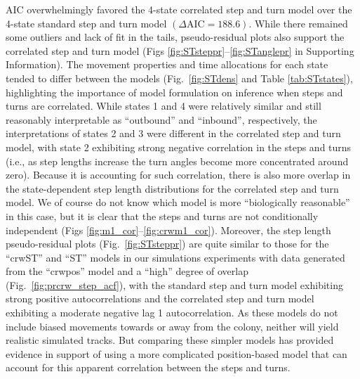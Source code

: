 \documentclass[12pt]{article}\usepackage[]{graphicx}\usepackage[]{xcolor}
\begin{document}
AIC overwhelmingly favored the 4-state correlated step and turn model over the 4-state standard step and turn model $(\Delta \text{AIC} = 188.6)$. While there remained some outliers and lack of fit in the tails, pseudo-residual plots also support the correlated step and turn model (Figs \ref{fig:STsteppr}--\ref{fig:STanglepr} in Supporting Information). The movement properties and time allocations for each state tended to differ between the models (Fig.\ \ref{fig:STdens} and Table \ref{tab:STstates}), highlighting the importance of model formulation on inference when steps and turns are correlated. While states 1 and 4 were relatively similar and still reasonably interpretable as ``outbound'' and ``inbound'', respectively, the interpretations of states 2 and 3 were different in the correlated step and turn model, with state 2 exhibiting strong negative correlation in the steps and turns (i.e., as step lengths increase the turn angles become more concentrated around zero). Because it is accounting for such correlation, there is also more overlap in the state-dependent step length distributions for the correlated step and turn model. We of course do not know which model is more ``biologically reasonable'' in this case, but it is clear that the steps and turns are not conditionally independent (Figs \ref{fig:m1_cor}--\ref{fig:crwm1_cor}). Moreover, the step length pseudo-residual plots (Fig.\ \ref{fig:STsteppr}) are quite similar to those for the ``crwST'' and ``ST'' models in our simulations experiments with data generated from the ``crwpos'' model and a ``high'' degree of overlap (Fig.\ \ref{fig:prcrw_step_acf}), with the standard step and turn model exhibiting strong positive autocorrelations and the correlated step and turn model exhibiting a moderate negative lag 1 autocorrelation. As these models do not include biased movements towards or away from the colony, neither will yield realistic simulated tracks. %
But comparing these simpler models has provided evidence in support of using a more complicated position-based model that can account for this apparent correlation between the steps and turns.
\end{document}
